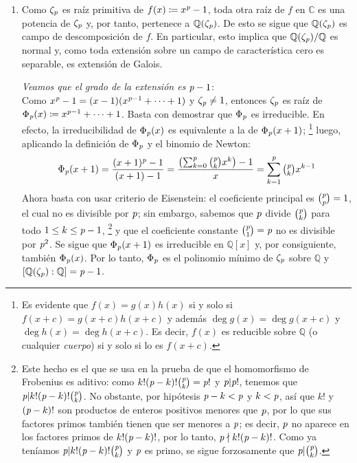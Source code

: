 \begin{sol}
\begin{enumerate}[label=\alph*)]
\item 
Como $\zeta_{\operatorname{\textit{p}}}$ es raíz primitiva de $f(x)\coloneq x^{\operatorname{\textit{p}}} - 1$, toda otra raíz de $f$ en $\mathbb{C}$ es una potencia de $\zeta_{\operatorname{\textit{p}}}$ y, por tanto, pertenece a $\mathbb{Q}(\zeta_{\operatorname{\textit{p}}})$. De esto se sigue que $\mathbb{Q}(\zeta_{\operatorname{\textit{p}}})$ es campo de descomposición de $f$. En particular, esto implica que $\mathbb{Q}(\zeta_{\operatorname{\textit{p}}})/\mathbb{Q}$ es normal y, como toda extensión sobre un campo de característica cero es separable, es extensión de Galois.\par

\emph{Veamos que el grado de la extensión es ${\operatorname{\textit{p}}}-1$}:\\
Como $x^{\operatorname{\textit{p}}}-1 = (x-1)(x^{{\operatorname{\textit{p}}}-1}+\cdots+1)$ y $\zeta_{\operatorname{\textit{p}}} \neq 1$, entonces $\zeta_{\operatorname{\textit{p}}}$ es raíz de $\Phi_{\operatorname{\textit{p}}}(x) \coloneq x^{{\operatorname{\textit{p}}}-1}+\cdots+1$. Basta con demostrar que $\Phi_{\operatorname{\textit{p}}}$ es irreducible. En efecto, la irreducibilidad de $\Phi_{\operatorname{\textit{p}}}(x)$ es equivalente a la de $\Phi_{\operatorname{\textit{p}}}(x+1)$;%
\footnote{
    Es evidente que $f(x) = g(x)h(x)$ si y solo si $f(x+c) = g(x+c)h(x+c)$ y además $\deg g(x) = \deg g(x+c)$ y $\deg h(x) = \deg h(x+c)$. Es decir, $f(x)$ es reducible sobre $\mathbb{Q}$ (o cualquier \emph{cuerpo}) si y solo si lo es $f(x+c)$.
}
luego, aplicando la definición de $\Phi_{\operatorname{\textit{p}}}$ y el binomio de Newton:
\[
\Phi_{\p}(x+1)%
=\frac{ (x+1)^{\p}-1 } {(x+1)-1 }%
=\frac{\left( \sum^{\p}_{k=0} \binom{\p}{k}x^{k}\right)  - 1}{x}%
=\sum^{\p}_{k=1} \tbinom{\p}{k} x^{k-1}
\]
Ahora basta con usar criterio de Eisenstein: el coeficiente principal es $\binom{{\operatorname{\textit{p}}}}{{\operatorname{\textit{p}}}} = 1$, el cual no es divisible por $\operatorname{\textit{p}}$; sin embargo, sabemos que $\operatorname{\textit{p}}$ divide $\binom{\operatorname{\textit{p}}}{k}$ para todo $1 \leq k \leq {\operatorname{\textit{p}}}-1$,%
\footnote{
    Este hecho es el que se usa en la prueba de que el homomorfismo de Frobenius es aditivo: como $k!({\operatorname{\textit{p}}}-k)!\binom{\operatorname{\textit{p}}}{k} = {\operatorname{\textit{p}}}!$ y ${\operatorname{\textit{p}}} | {\operatorname{\textit{p}}}!$, tenemos que ${\operatorname{\textit{p}}} | k!({\operatorname{\textit{p}}}-k)!\binom{\operatorname{\textit{p}}}{k}$. No obstante, por hipótesis ${\operatorname{\textit{p}}}-k < {\operatorname{\textit{p}}}$ y $k < {\operatorname{\textit{p}}}$, así que $k!$ y $({\operatorname{\textit{p}}}-k)!$ son productos de enteros positivos menores que $\operatorname{\textit{p}}$, por lo que sus factores primos también tienen que ser menores a ${\operatorname{\textit{p}}}$; es decir, ${\operatorname{\textit{p}}}$ no aparece en los factores primos de $k!({\operatorname{\textit{p}}}-k)!$, por lo tanto, ${\operatorname{\textit{p}}} \nmid k!({\operatorname{\textit{p}}}-k)!$. Como ya teníamos ${\operatorname{\textit{p}}} | k!({\operatorname{\textit{p}}}-k)!\binom{\operatorname{\textit{p}}}{k}$ y ${\operatorname{\textit{p}}}$ es primo, se sigue forzosamente que ${\operatorname{\textit{p}}} | \binom{\operatorname{\textit{p}}}{k}$.
}
y que el coeficiente constante $\binom{\operatorname{\textit{p}}}{1} = \operatorname{\textit{p}}$ no es divisible por $\operatorname{\textit{p}}^2$. Se sigue que $\Phi_{\operatorname{\textit{p}}}(x+1)$ es irreducible en $\mathbb{Q}[x]$ y, por consiguiente, también $\Phi_{\operatorname{\textit{p}}}(x)$. Por lo tanto, $\Phi_{\operatorname{\textit{p}}}$ es el polinomio mínimo de $\zeta_{\operatorname{\textit{p}}}$ sobre $\mathbb{Q}$ y $[\mathbb{Q}(\zeta_{\operatorname{\textit{p}}}) : \mathbb{Q}] = {\operatorname{\textit{p}}}-1$.\par

\end{enumerate}
\end{sol}
